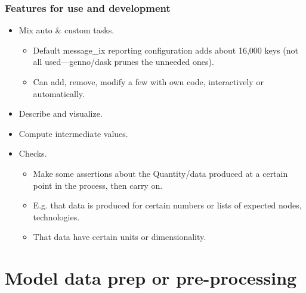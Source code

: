 \documentclass[12pt,aspectratio=169]{beamer}
\begin{document}
\begin{frame}[allowframebreaks]
\frametitle{Features for use and development}
\begin{itemize}
  \item Mix auto & custom tasks.
    \begin{itemize}
      \item Default message_ix reporting configuration adds about 16,000 keys (not all used—genno/dask prunes the unneeded ones).
      \item Can add, remove, modify a few with own code, interactively or automatically.
    \end{itemize}
  \item Describe and visualize.
  \item Compute intermediate values.
  \item Checks.
    \begin{itemize}
      \item Make some assertions about the Quantity/data produced at a certain point in the process, then carry on.
      \item E.g. that data is produced for certain numbers or lists of expected nodes, technologies.
      \item That data have certain units or dimensionality.
    \end{itemize}
\end{itemize}
\end{frame}

\section{Model data prep or pre-processing}
\end{document}
